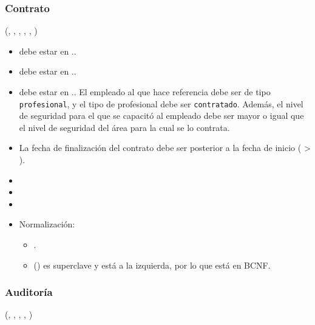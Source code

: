 \subsubsection{Contrato}

    (, , ,
        , , )

    \begin{itemize}
        \item {} debe estar en ..
        \item {} debe estar en ..
        \item {} debe estar en .. El 
            empleado al que hace referencia debe ser de tipo \verb|profesional|,
            y el tipo de profesional debe ser \verb|contratado|. Además, el 
            nivel de seguridad para el que se capacitó al empleado debe ser 
            mayor o igual que el nivel de seguridad del área para la cual se lo
            contrata.
        \item La fecha de finalización del contrato debe ser posterior a la 
            fecha de inicio ( > ).
        \item {}
        \item {}
        \item {}

        \item Normalización:

            \begin{itemize}
                \item {}.

                \item () es superclave y está a la izquierda, 
                    por lo que está en BCNF.
            \end{itemize}
    \end{itemize}


\subsubsection{Auditoría}
    (, , 
          , , )

